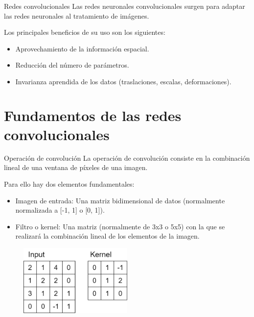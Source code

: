 \begin{frame}{Redes convolucionales}
Las redes neuronales \alert{convolucionales} surgen para adaptar las redes neuronales al \alert{tratamiento de imágenes}.

Los principales beneficios de su uso son los siguientes:
\begin{itemize}
    \item Aprovechamiento de la información \alert{espacial}.
    \item Reducción del número de \alert{parámetros}.
    \item \alert{Invarianza} aprendida de los datos (traslaciones, escalas, deformaciones).
\end{itemize}
\end{frame}

\section{Fundamentos de las redes convolucionales}

\begin{frame}{Operación de convolución}
La operación de \alert{convolución} consiste en la \alert{combinación lineal} de una ventana de píxeles de una imagen.

Para ello hay dos elementos fundamentales:
\begin{itemize}
    \item \alert{Imagen de entrada}: Una matriz \alert{bidimensional} de datos (normalmente normalizada a \alert{[-1, 1]} o \alert{[0, 1]}).
    \item \alert{Filtro o kernel}: Una matriz (normalmente de 3x3 o 5x5) con la que se realizará la \alert{combinación lineal} de los elementos de la imagen.
\end{itemize}

\begin{figure}
    \centering
    \includegraphics[width=0.5\textwidth]{Slides/figures/Tema 3/Convolucion2D_1.png}
\end{figure}
\end{frame}

